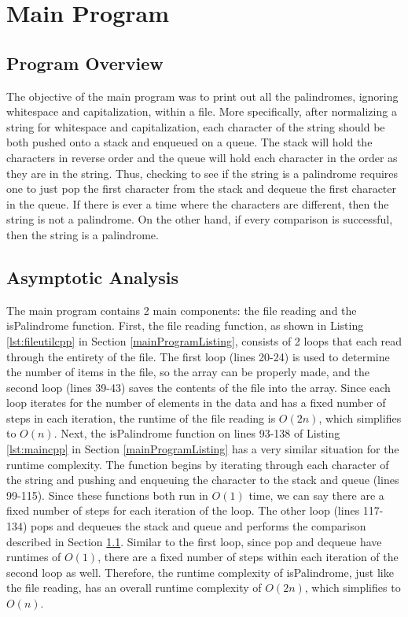 \documentclass[letterpaper, 10pt,DIV=13]{scrartcl}
\numberwithin{equation}{section} %
\numberwithin{figure}{section} %
\numberwithin{table}{section} %
\begin{document}
\section{Main Program}
\subsection{Program Overview}\label{mainOverview}
The objective of the main program was to print out all the palindromes, ignoring whitespace and capitalization, within a file. More specifically, after normalizing a string for whitespace and capitalization, each character of the string should be both pushed onto a stack and enqueued on a queue. The stack will hold the characters in reverse order and the queue will hold each character in the order as they are in the string. Thus, checking to see if the string is a palindrome requires one to just pop the first character from the stack and dequeue the first character in the queue. If there is ever a time where the characters are different, then the string is not a palindrome. On the other hand, if every comparison is successful, then the string is a palindrome.

\subsection{Asymptotic Analysis}
The main program contains 2 main components: the file reading and the isPalindrome function. First, the file reading function, as shown in Listing \ref{lst:fileutilcpp} in Section \ref{mainProgramListing}, consists of 2 loops that each read through the entirety of the file. The first loop (lines 20-24) is used to determine the number of items in the file, so the array can be properly made, and the second loop (lines 39-43) saves the contents of the file into the array. Since each loop iterates for the number of elements in the data and has a fixed number of steps in each iteration, the runtime of the file reading is $O(2n)$, which simplifies to $O(n)$. Next, the isPalindrome function on lines 93-138 of Listing \ref{lst:maincpp} in Section \ref{mainProgramListing} has a very similar situation for the runtime complexity. The function begins by iterating through each character of the string and pushing and enqueuing the character to the stack and queue (lines 99-115). Since these functions both run in $O(1)$ time, we can say there are a fixed number of steps for each iteration of the loop. The other loop (lines 117-134) pops and dequeues the stack and queue and performs the comparison described in Section \ref{mainOverview}. Similar to the first loop, since pop and dequeue have runtimes of $O(1)$, there are a fixed number of steps within each iteration of the second loop as well. Therefore, the runtime complexity of isPalindrome, just like the file reading, has an overall runtime complexity of $O(2n)$, which simplifies to $O(n)$.
\end{document}
